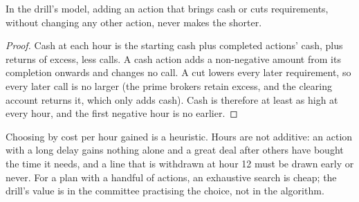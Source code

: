 \begin{omfigure}

\label{fig:fm:crisis-management:steps}
\end{omfigure}

\begin{proposition}\label{prop:fm:crisis-management:monotone}
In the drill's model, adding an action that brings cash or cuts requirements, without changing any other action, never makes the 
shorter.
\end{proposition}

\begin{proof}
Cash at each hour is the starting cash plus completed actions' cash, plus returns of excess, less calls. A cash action adds a non-negative amount
from its completion onwards and changes no call. A cut lowers every later requirement, so every later call is no larger (the prime brokers retain
excess, and the clearing account returns it, which only adds cash). Cash is therefore at least as high at every hour, and the first negative hour is no
earlier.
\end{proof}

\begin{remark}\label{rem:fm:crisis-management:greedy}
Choosing by cost per hour gained is a heuristic. Hours are not additive: an action with a long delay gains nothing alone and a great deal after
others have bought the time it needs, and a line that is withdrawn at hour 12 must be drawn early or never. For a plan with a handful of actions, an
exhaustive search is cheap; the drill's value is in the committee practising the choice, not in the algorithm.
\end{remark}

